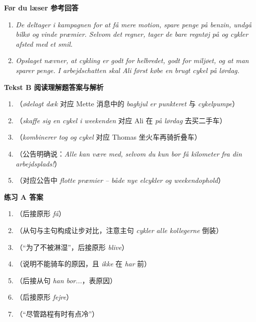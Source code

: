 \begin{answerbox}
\textbf{Før du læser 参考回答}
\begin{enumerate}
  \item \textit{De deltager i kampagnen for at få mere motion, spare penge på benzin, undgå bilkø og vinde præmier. Selvom det regner, tager de bare regntøj på og cykler afsted med et smil.}
  \item \textit{Opslaget nævner, at cykling er godt for helbredet, godt for miljøet, og at man sparer penge. I arbejdschatten skal Ali først købe en brugt cykel på lørdag.}
\end{enumerate}

\textbf{Tekst B 阅读理解题答案与解析}
\begin{enumerate}
  \item {}（\textit{ødelagt dæk} 对应 Mette 消息中的 \textit{baghjul er punkteret} 与 \textit{cykelpumpe}）
  \item {}（\textit{skaffe sig en cykel i weekenden} 对应 Ali 在 \textit{på lørdag} 去买二手车）
  \item {}（\textit{kombinerer tog og cykel} 对应 Thomas 坐火车再骑折叠车）
  \item {}（公告明确说：\textit{Alle kan være med, selvom du kun bor få kilometer fra din arbejdsplads!}）
  \item {}（对应公告中 \textit{flotte præmier -- både nye elcykler og weekendophold}）
\end{enumerate}

\textbf{练习 A 答案}
\begin{enumerate}
  \item {}（后接原形 \textit{få}）
  \item {}（从句与主句构成让步对比，注意主句 \textit{cykler alle kollegerne} 倒装）
  \item {}（“为了不被淋湿”，后接原形 \textit{blive}）
  \item {}（说明不能骑车的原因，且 \textit{ikke} 在 \textit{har} 前）
  \item {}（后接从句 \textit{han bor...}，表原因）
  \item {}（后接原形 \textit{fejre}）
  \item {}（“尽管路程有时有点冷”）
\end{enumerate}


\end{answerbox}
